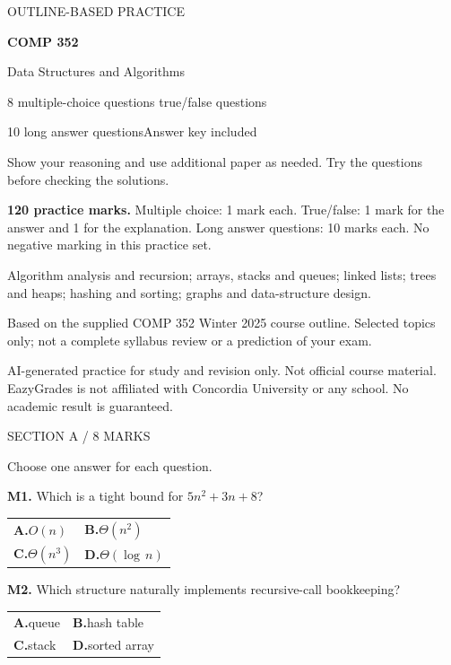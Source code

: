 \documentclass[11pt,a4paper]{article}
\newcommand{\pagetitle}[2]{\textcolor{muted}{\small\MakeUppercase{#1}}\par\vspace{4pt}{\LARGE\bfseries #2}\par\vspace{10pt}}
\newcommand{\qtitle}[1]{\par\noindent{\large\bfseries #1}\par\vspace{3pt}}
\begin{document}
\pagetitle{Outline-based practice}{Core Exam Practice}
{\Large\bfseries COMP 352}\par
{\large Data Structures and Algorithms}\par\vspace{14pt}
8 multiple-choice questions\quad\textbullet{} true/false questions\par
10 long answer questions\quad\textbullet\quad Answer key included\par\vspace{16pt}
\qtitle{Before you begin}
Show your reasoning and use additional paper as needed. Try the questions before checking the solutions.

\textbf{120 practice marks.} Multiple choice: 1 mark each. True/false: 1 mark for the answer and 1 for the explanation. Long answer questions: 10 marks each. No negative marking in this practice set.\par
\vspace{16pt}
\qtitle{Topics}
Algorithm analysis and recursion; arrays, stacks and queues; linked lists; trees and heaps; hashing and sorting; graphs and data-structure design.
\vfill
{\small\color{muted}Based on the supplied COMP 352 Winter 2025 course outline. Selected topics only; not a complete syllabus review or a prediction of your exam.\par
AI-generated practice for study and revision only. Not official course material. EazyGrades is not affiliated with Concordia University or any school. No academic result is guaranteed.}
\newpage
\pagetitle{Section A / 8 marks}{Multiple choice}
Choose one answer for each question.\par
\begin{minipage}{\linewidth}
\textbf{M1.} Which is a tight bound for $5n^{2}+3n+8$?\par
\renewcommand{\arraystretch}{1.4}\begin{tabularx}{\linewidth}{@{}X X@{}}
\textbf{A.}\enspace $O(n)$ & \textbf{B.}\enspace $\Theta(n^2)$ \\
\textbf{C.}\enspace $\Theta(n^3)$ & \textbf{D.}\enspace $\Theta(\log\,n)$
\end{tabularx}\end{minipage}\par\vspace{7pt}
\begin{minipage}{\linewidth}
\textbf{M2.} Which structure naturally implements recursive-call bookkeeping?\par
\renewcommand{\arraystretch}{1.4}\begin{tabularx}{\linewidth}{@{}X X@{}}
\textbf{A.}\enspace queue & \textbf{B.}\enspace hash table \\
\textbf{C.}\enspace stack & \textbf{D.}\enspace sorted array
\end{tabularx}\end{minipage}\par\vspace{7pt}
\end{document}
